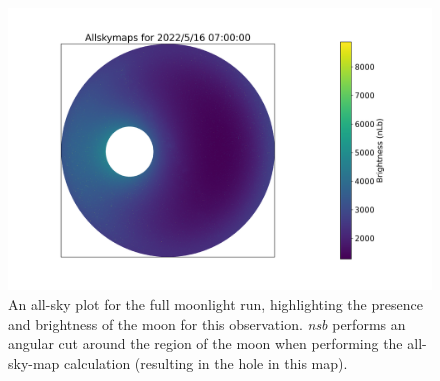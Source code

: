 \begin{figure}[t!]
\begin{centering}
\includegraphics[width=1\columnwidth]{./figures/allskyetacarextreme.png}
\caption{An all-sky plot for the full moonlight run, highlighting the presence and brightness of the moon for this observation. \textit{nsb} performs an angular cut around the region of the moon when performing the all-sky-map calculation (resulting in the hole in this map).}
\label{fig:allskyetacarextreme}
\end{centering}
\end{figure}

